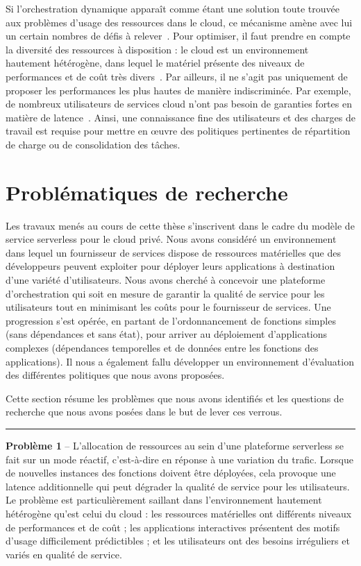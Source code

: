 Si l'orchestration dynamique apparaît comme étant une solution toute trouvée aux problèmes d'usage des ressources dans le cloud, ce mécanisme amène avec lui un certain nombres de défis à relever~\cite{Lannurien2023}. Pour optimiser, il faut prendre en compte la diversité des ressources à disposition : le cloud est un environnement hautement hétérogène, dans lequel le matériel présente des niveaux de performances et de coût très divers~\cite{reissHeterogeneityDynamicityClouds}. Par ailleurs, il ne s'agit pas uniquement de proposer les performances les plus hautes de manière indiscriminée. Par exemple, de nombreux utilisateurs de services cloud n'ont pas besoin de garanties fortes en matière de latence~\cite{tirmaziBorgNextGeneration2020}. Ainsi, une connaissance fine des utilisateurs et des charges de travail est requise pour mettre en œuvre des politiques pertinentes de répartition de charge ou de consolidation des tâches.

\section{Problématiques de recherche}

Les travaux menés au cours de cette thèse s'inscrivent dans le cadre du modèle de service serverless pour le cloud privé. Nous avons considéré un environnement dans lequel un fournisseur de services dispose de ressources matérielles que des développeurs peuvent exploiter pour déployer leurs applications à destination d'une variété d'utilisateurs. Nous avons cherché à concevoir une plateforme d'orchestration qui soit en mesure de garantir la qualité de service pour les utilisateurs tout en minimisant les coûts pour le fournisseur de services. Une progression s'est opérée, en partant de l'ordonnancement de fonctions simples (sans dépendances et sans état), pour arriver au déploiement d'applications complexes (dépendances temporelles et de données entre les fonctions des applications). Il nous a également fallu développer un environnement d'évaluation des différentes politiques que nous avons proposées.

Cette section résume les problèmes que nous avons identifiés et les questions de recherche que nous avons posées dans le but de lever ces verrous.

\begin{center}
    \rule{4cm}{0.4pt}
\end{center}

\textbf{Problème 1} -- L'allocation de ressources au sein d'une plateforme serverless se fait sur un mode réactif, c'est-à-dire en réponse à une variation du trafic. Lorsque de nouvelles instances des fonctions doivent être déployées, cela provoque une latence additionnelle qui peut dégrader la qualité de service pour les utilisateurs. Le problème est particulièrement saillant dans l'environnement hautement hétérogène qu'est celui du cloud : les ressources matérielles ont différents niveaux de performances et de coût ; les applications interactives présentent des motifs d'usage difficilement prédictibles ; et les utilisateurs ont des besoins irréguliers et variés en qualité de service.

